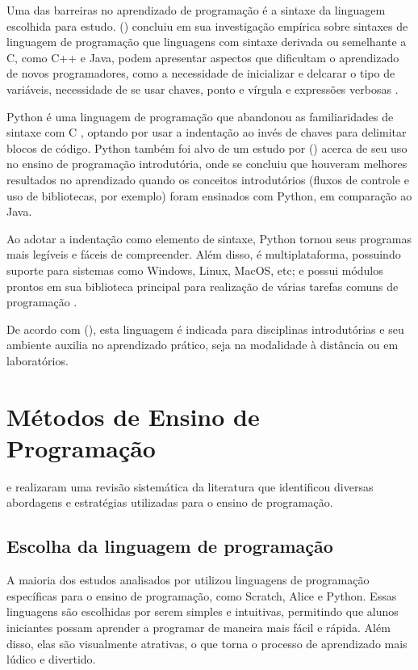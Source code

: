 Uma das barreiras no aprendizado de programação é a sintaxe da linguagem escolhida para estudo. \citeauthor{stefik2013} (\citeyear{stefik2013}) concluiu em sua investigação empírica sobre sintaxes de linguagem de programação que linguagens com sintaxe derivada ou semelhante a C, como C++ e Java, podem apresentar aspectos que dificultam o aprendizado de novos programadores, como a necessidade de inicializar e delcarar o tipo de variáveis, necessidade de se usar chaves, ponto e vírgula e expressões verbosas \cite{mannila2006}.

Python é uma linguagem de programação que abandonou as familiaridades de sintaxe com C \cite{stefik2013}, optando por usar a indentação ao invés de chaves para delimitar blocos de código. Python também foi alvo de um estudo por \citeauthor{jayal2015} (\citeyear{jayal2015}) acerca de seu uso no ensino de programação introdutória, onde se concluiu que houveram melhores resultados no aprendizado quando os conceitos introdutórios (fluxos de controle e uso de bibliotecas, por exemplo) foram ensinados com Python, em comparação ao Java.

Ao adotar a indentação como elemento de sintaxe, Python tornou seus programas mais legíveis e fáceis de compreender. Além disso, é multiplataforma, possuindo suporte para sistemas como Windows, Linux, MacOS, etc; e possui módulos prontos em sua biblioteca principal para realização de várias tarefas comuns de programação \cite{moraispires2002}.

De acordo com \citeauthor{fangohr2004} (\citeyear{fangohr2004}), esta linguagem é indicada para disciplinas introdutórias e seu ambiente auxilia no aprendizado prático, seja na modalidade à distância ou em laboratórios.

\section{Métodos de Ensino de Programação}

\cite{Silva2014} e \cite{Silva2018} realizaram uma revisão sistemática da literatura que identificou diversas abordagens e estratégias utilizadas para o ensino de programação.

\subsection{Escolha da linguagem de programação}

A maioria dos estudos analisados por \cite{Silva2014} utilizou linguagens de programação específicas para o ensino de programação, como Scratch, Alice e Python. Essas linguagens são escolhidas por serem simples e intuitivas, permitindo que alunos iniciantes possam aprender a programar de maneira mais fácil e rápida. Além disso, elas são visualmente atrativas, o que torna o processo de aprendizado mais lúdico e divertido.

